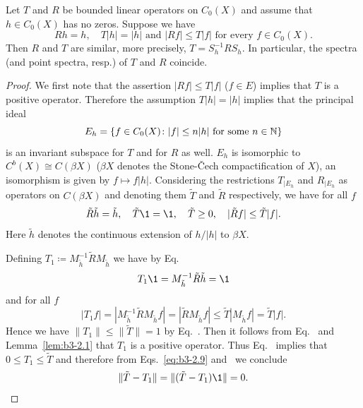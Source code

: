 \begin{lemma}\label{lem:b3-2.3}%
Let $T$ and $R$ be bounded linear operators on $C_{0}(X)$ and assume that $h \in C_{0}(X)$ has no zeros. 
Suppose we have
\begin{equation}\label{eq:b3-2.8}
	Rh = h, \quad T|h| = |h| \text{ and } |Rf| \leq T|f| \text{ for every $f \in C_{0}(X)$.} 
\end{equation}
Then $R$ and $T$ are similar, more precisely, $T = S_{h}^{-1}RS_{h}$.
In particular, the spectra (and point spectra, resp.) of\/ $T$ and $R$ coincide.
\end{lemma}
\begin{proof}
	We first note that the assertion $|Rf| \leq T|f|$ ($f \in E$) implies that $T$ is a positive operator.
	Therefore the assumption $T|h| = |h|$ implies that the principal ideal 
    \[
    E_{h} = \{f \in C_{0}(X) \colon |f| \leq n|h| \text{ for some } n \in \N\}
    \] 
    is an invariant subspace for $T$ and for $R$ as well.
	$E_{h}$ is isomorphic to $C^{b}(X) \cong C(\beta X)$ ($\beta X$ denotes the Stone-Čech compactification of\/ $X$), an isomorphism is given by $f \mapsto f|h|$.
	Considering the restrictions $T_{|E_{h}}$ and $R_{|E_{h}}$ as operators on $C(\beta X)$ and denoting them $\tilde{T}$ and $\tilde{R}$ respectively, we have for all $f$
\begin{equation}\label{eq:b3-2.9}
		\tilde{R}\tilde{h} = \tilde{h}, \quad \tilde{T}\1 = \1, \quad \tilde{T} \geq 0, \quad |\tilde{R}f| \leq \tilde{T}|f| .
	\end{equation}
	Here $\tilde{h}$ denotes the continuous extension of\/ $h/|h|$ to $\beta X$.
	
	Defining $T_{1} \coloneq M_{\tilde{h}}^{-1}\tilde{R}M_{\tilde{h}}$ we have by Eq.~
	\begin{equation}\label{eq:b3-2.10}
	T_{1}\1 = M_{\tilde{h}}^{-1}\tilde{R}\tilde{h} = \1 
	\end{equation}
    and for all $f$ 
	\begin{equation}\label{eq:b3-2.11}
	|T_{1}f| = |M_{\tilde{h}}^{-1}\tilde{R}M_{\tilde{h}}f| = |\tilde{R}M_{\tilde{h}}f| \leq \tilde{T}|M_{\tilde{h}}f| = \tilde{T}|f| .
	\end{equation}
	Hence we have $\|T_{1}\| \leq \|\tilde{T}\| = 1$ by Eq.~.
	Then it follows from Eq.~ and Lemma~\ref{lem:b3-2.1} that $T_{1}$ is a positive operator.
	Thus Eq.~ implies that $0 \leq T_{1} \leq \tilde{T}$ and therefore from Eqs.~\eqref{eq:b3-2.9} and~ we conclude
\begin{equation*}
    \|\tilde{T} - T_{1}\| = \|(\tilde{T} - T_{1})\1\| = 0.
    \qedhere
\end{equation*}
\end{proof}

